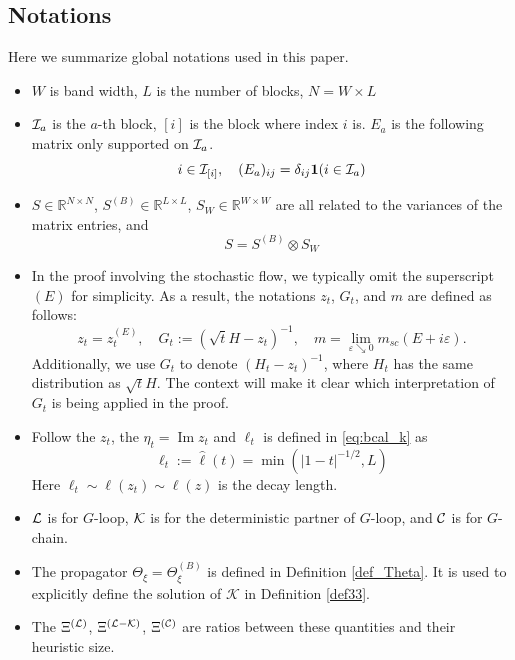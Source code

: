 \documentclass[10pt,reqno]{article}
\DeclareMathOperator{\im}{{\mathrm{Im}}}
\theoremstyle{plain} %
\theoremstyle{remark}
\numberwithin{equation}{section}
\begin{document}
\subsection{Notations}
Here we summarize  global notations used in this paper. 
\begin{itemize}
    \item $W$ is band width, $L$ is the number of blocks, $N=W\times L$
    \item ${\cal I}_a$ is the $a$-th block, $[i]$ is the block where index $i$ is. $E_a$ is the following matrix only supported on ${\cal I}_a$. 
    $$
    i\in {\cal I}_{[i]}, \quad (E_a)_{ij}=\delta_{ij}{\bf 1}(i\in {\cal I}_a)$$
    \item $S\in \mathbb R^{N\times N}$, $S^{(B)}\in \mathbb R^{L\times L}$, $S_W\in \mathbb R^{W\times W}$ are all related to the variances of the matrix entries, and 
    $$
S= S^{(B)}\otimes S_{W}
$$
\item In the proof involving the stochastic flow, we typically omit the superscript $(E)$ for simplicity. As a result, the notations $z_t$, $G_t$, and $m$ are defined as follows:
\[
z_t = z_t^{(E)}, \quad G_t := (\sqrt{t} H - z_t)^{-1}, \quad m = \lim_{\varepsilon \searrow 0} m_{sc}(E + i \varepsilon).
\]
Additionally, we use $G_t$ to denote $(H_t - z_t)^{-1}$, where $H_t$ has the same distribution as $\sqrt{t} H$. The context will make it clear which interpretation of $G_t$ is being applied in the proof.
\item Follow the $z_t$, the $\eta_t=\im z_t$ and $\ell_t$ is defined in \eqref{eq:bcal_k} as 
$$ \ell_t:=\hat \ell(t)=\min(|1-t|^{-1/2}, L)$$
Here $\ell_t\sim \ell(z_t)\sim \ell(z)$ is  the decay  length. 

    \item $\cal L$ is for $G$-loop, $\cal K$ is  for the deterministic partner of $G$-loop,  and $\cal C$ is for $G$-chain. 

    \item The propagator $\Theta_\xi = \Theta^{(B)}_{\xi}$ is defined in Definition \ref{def_Theta}. It is used to explicitly define the solution of $\mathcal{K}$ in Definition \ref{def33}.

    
    \item The $\Xi^{({\cal L})}$, $\Xi^{({\cal L-K})}$, $\Xi^{({\cal C})}$ are ratios between these quantities and their heuristic size.  
    

\end{itemize}
\end{document}

